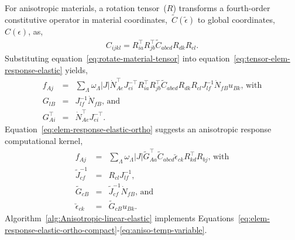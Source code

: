 \documentclass[]             %
{NASA}                       %
\begin{document}
For anisotropic materials, a rotation tensor~($R$) transforms a fourth-order constitutive operator in material coordinates,~$\widetilde{C}(\widetilde{\epsilon})$ to global coordinates,~$C(\epsilon)$, as,
\begin{eqnarray}
\label{eq:rotate-material-tensor}
C_{ijkl} = R_{ia}^{\top}R_{jb}^{\top}\widetilde{C}_{abcd}R_{dk}R_{cl}\text{.}
\end{eqnarray}
Substituting equation~\ref{eq:rotate-material-tensor} into equation~\ref{eq:tensor-elem-response-elastic} yields,
\begin{eqnarray}\label{eq:elem-response-elastic-ortho}
f_{Aj} & = & \sum_{\Lambda}\omega_{\Lambda}|J| \dot{N}_{Ae}^{\top} J_{ei}^{-\top} R_{ia}^{\top} R_{jb}^{\top} \widetilde{C}_{abcd} R_{dk} R_{cl} J_{lf}^{-1} \dot{N}_{fB} u_{Bk}\text{, with}\\
{G}_{lB} & = & {J}_{lf}^{-1}\dot{N}_{fB}\text{, and}\\
{G}^{\top}_{Ai} & = & \dot{N}_{Ae}^{\top}{J}_{ei}^{-\top}\text{.}
\end{eqnarray}
Equation~\ref{eq:elem-response-elastic-ortho} suggests an anisotropic response computational kernel,
\begin{eqnarray}
\label{eq:geo-distort-rotated}
f_{Aj} & = & %
\sum_{\Lambda} \omega_{\Lambda} |J| \widetilde{G}_{Aa}^{\top} \widetilde{C}_{abcd} \breve{\epsilon}_{ck} R_{kd}^{\top} R_{bj}\text{, with}\label{eq:elem-response-elastic-ortho-compact}\\
\widetilde{J}_{cf}^{-1} & = & R_{cl} J_{lf}^{-1}\text{,}\label{eq:jacobian-rotated}\\
\widetilde{G}_{cB} & = & \widetilde{J}_{cf}^{-1} \dot{N}_{fB}\text{, and}\\
\breve{\epsilon}_{ck} & = & \widetilde{G}_{cB} u_{Bk}\text{.}\label{eq:aniso-temp-variable}
\end{eqnarray}
Algorithm~\ref{alg:Anisotropic-linear-elastic} implements
Equations~\ref{eq:elem-response-elastic-ortho-compact}\nobreakdash-\ref{eq:aniso-temp-variable}.
\end{document}
